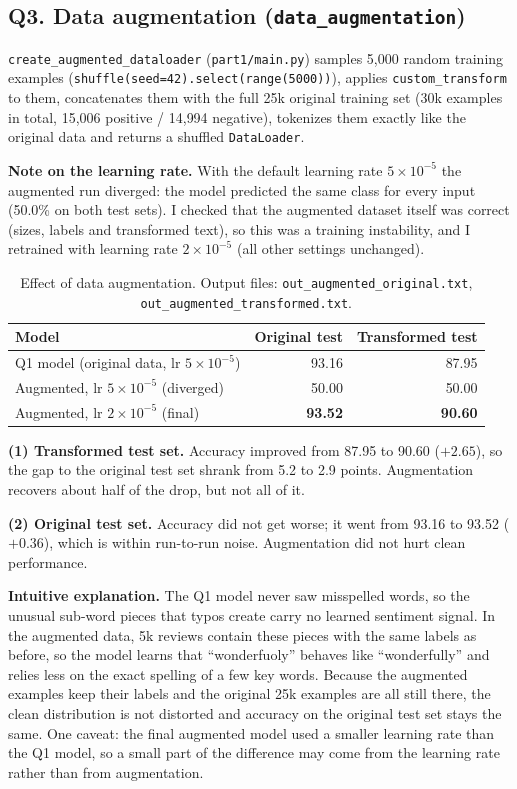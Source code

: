 \documentclass[11pt]{article}
\begin{document}
\subsection{Q3. Data augmentation (\texttt{data\_augmentation})}

\texttt{create\_augmented\_dataloader} (\texttt{part1/main.py}) samples 5{,}000 random training examples
(\texttt{shuffle(seed=42).select(range(5000))}), applies \texttt{custom\_transform} to them, concatenates them
with the full 25k original training set (30k examples in total, 15{,}006 positive / 14{,}994 negative),
tokenizes them exactly like the original data and returns a shuffled \texttt{DataLoader}.

\textbf{Note on the learning rate.} With the default learning rate $5\times10^{-5}$ the augmented run diverged:
the model predicted the same class for every input (50.0\% on both test sets). I checked that the augmented
dataset itself was correct (sizes, labels and transformed text), so this was a training instability, and I
retrained with learning rate $2\times10^{-5}$ (all other settings unchanged).

\begin{table}[H]
\centering
\begin{tabular}{lrr}
\toprule
Model & Original test & Transformed test \\
\midrule
Q1 model (original data, lr $5\times10^{-5}$) & 93.16 & 87.95 \\
Augmented, lr $5\times10^{-5}$ (diverged) & 50.00 & 50.00 \\
Augmented, lr $2\times10^{-5}$ (final) & \textbf{93.52} & \textbf{90.60} \\
\bottomrule
\end{tabular}
\caption{Effect of data augmentation. Output files: \texttt{out\_augmented\_original.txt},
\texttt{out\_augmented\_transformed.txt}.}
\end{table}

\textbf{(1) Transformed test set.} Accuracy improved from 87.95 to 90.60 ($+2.65$), so the gap to the original
test set shrank from 5.2 to 2.9 points. Augmentation recovers about half of the drop, but not all of it.

\textbf{(2) Original test set.} Accuracy did not get worse; it went from 93.16 to 93.52 ($+0.36$), which is
within run-to-run noise. Augmentation did not hurt clean performance.

\textbf{Intuitive explanation.} The Q1 model never saw misspelled words, so the unusual sub-word pieces that typos
create carry no learned sentiment signal. In the augmented data, 5k reviews contain these pieces with the same
labels as before, so the model learns that ``wonderfuoly'' behaves like ``wonderfully'' and relies less on the
exact spelling of a few key words. Because the augmented examples keep their labels and the original 25k
examples are all still there, the clean distribution is not distorted and accuracy on the original test set
stays the same. One caveat: the final augmented model used a smaller learning rate than the Q1 model, so a
small part of the difference may come from the learning rate rather than from augmentation.
\end{document}
